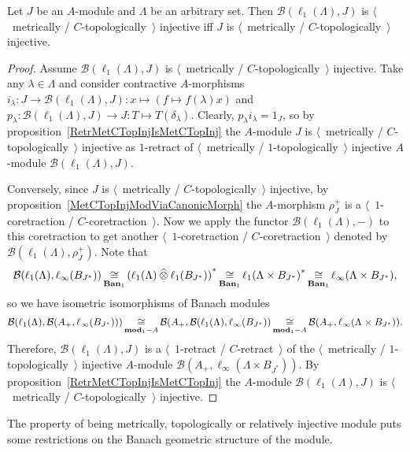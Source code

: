 \begin{proposition}\label{MapsFroml1toMetTopInj} Let $J$ be an $A$-module and
$\Lambda$ be an arbitrary set. Then $\mathcal{B}(\ell_1(\Lambda),J)$ is
$\langle$~metrically / $C$-topologically~$\rangle$ injective iff $J$ is
$\langle$~metrically / $C$-topologically~$\rangle$ injective.
\end{proposition}
\begin{proof} 
Assume $\mathcal{B}(\ell_1(\Lambda), J)$ is $\langle$~metrically /
$C$-topologically~$\rangle$ injective. Take any $\lambda\in\Lambda$ and consider
contractive $A$-morphisms
$i_\lambda:J\to\mathcal{B}(\ell_1(\Lambda),J):x\mapsto(f\mapsto f(\lambda)x)$
and $p_\lambda:\mathcal{B}(\ell_1(\Lambda),J)\to J:T\mapsto T(\delta_\lambda)$.
Clearly, $p_\lambda i_\lambda=1_J$, so by 
proposition~\ref{RetrMetCTopInjIsMetCTopInj} the $A$-module $J$ 
is $\langle$~metrically / $C$-topologically~$\rangle$ injective as $1$-retract 
of $\langle$~metrically / $1$-topologically~$\rangle$ injective 
$A$-module $\mathcal{B}(\ell_1(\Lambda),J)$.

Conversely, since $J$ is $\langle$~metrically / $C$-topologically~$\rangle$
injective, by proposition~\ref{MetCTopInjModViaCanonicMorph} 
the $A$-morphism $\rho_J^+$ is 
a $\langle$~$1$-coretraction / $C$-coretraction~$\rangle$. 
Now we apply the functor $\mathcal{B}(\ell_1(\Lambda),-)$ to this 
coretraction to get another 
$\langle$~$1$-coretraction / $C$-coretraction~$\rangle$ denoted by
$\mathcal{B}(\ell_1(\Lambda),\rho_J^+)$. Note that 
$$
\mathcal{B}(\ell_1(\Lambda),\ell_\infty(B_{J^*}))
\mathop{\mathbin{\cong}}\limits_{\mathbf{Ban}_1}
{(\ell_1(\Lambda)\mathbin{\widehat{\otimes}} \ell_1(B_{J^*}))}^*
\mathop{\mathbin{\cong}}\limits_{\mathbf{Ban}_1}
{\ell_1(\Lambda\times B_{J^*})}^*
\mathop{\mathbin{\cong}}\limits_{\mathbf{Ban}_1}
\ell_\infty(\Lambda\times B_{J^*}),
$$ 
so we have isometric isomorphisms of Banach modules
$$
\mathcal{B}(\ell_1(\Lambda),\mathcal{B}(A_+,\ell_\infty(B_{J^*})))
\mathop{\mathbin{\cong}}\limits_{\mathbf{mod}_1-A}
\mathcal{B}(A_+,\mathcal{B}(\ell_1(\Lambda),\ell_\infty(B_{J^*}))
\mathop{\mathbin{\cong}}\limits_{\mathbf{mod}_1-A}
\mathcal{B}(A_+,\ell_\infty(\Lambda\times B_{J^*})).
$$ 
Therefore, $\mathcal{B}(\ell_1(\Lambda),J)$ is a $\langle$~$1$-retract /
$C$-retract~$\rangle$ of the $\langle$~metrically / $1$-topologically~$\rangle$
injective $A$-module $\mathcal{B}(A_+,\ell_\infty(\Lambda\times B_{J^*}))$. By
proposition~\ref{RetrMetCTopInjIsMetCTopInj} the $A$-module
$\mathcal{B}(\ell_1(\Lambda), J)$ is $\langle$~metrically /
$C$-topologically~$\rangle$ injective.
\end{proof}

The property of being metrically, topologically or relatively injective module 
puts some restrictions on the Banach geometric structure of the module.

